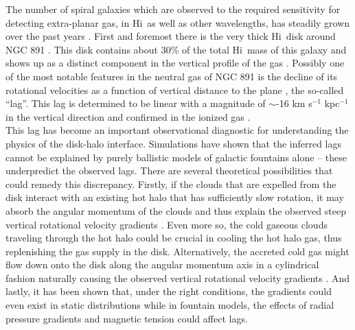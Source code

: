 \documentclass[useAMS,usenatbib]{mn2e}
\newcommand\HI{H{\sc i}}
\begin{document}
\indent The number of spiral galaxies which are observed to the required sensitivity for detecting extra-planar gas, in \HI\ as well as other wavelengths, has steadily grown over the past years  \citep{1997ApJ...491..140S, 2000A&A...356L..49S,2001A&A...377..759L,2002AJ....123.3124F,2005A&A...439..947B,2005A&A...436..101W,2008A&A...490..555B, Zschaechner2011}. First and foremost there is  the very thick \HI\ disk around NGC 891 \citep{1997ApJ...491..140S, Oosterloo2007}.  This disk contains about 30\% of the total \HI\ mass of this galaxy and shows up as a distinct component in the vertical profile of the gas \citep{Oosterloo2007}. Possibly  one of the most notable features in the neutral gas  of NGC 891 is the  decline of its rotational velocities as a function of vertical distance to the plane \citep{2005ASPC..331..239F}, the so-called ``lag''. This lag is determined to be linear with a magnitude of  $\sim$-16 km s$^{-1}$ kpc$^{-1}$ in the vertical direction and confirmed in the ionized gas \citep{2006ApJ...647.1018H,Kamphuis2007a}.\\
\indent This lag has become an important observational diagnostic for understanding the physics of the disk-halo interface. Simulations have shown that the inferred lags cannot be explained by purely ballistic models of galactic fountains alone \citep{2002ApJ...578...98C,2007ApJ...663..933H,2008MNRAS.386..935F} -- these underpredict the observed lags. There are several theoretical possibilities that could remedy this discrepancy. Firstly, if the clouds that are expelled from the disk interact with an existing hot halo that has sufficiently slow rotation, it may absorb the angular momentum of the clouds and thus explain the observed steep vertical rotational velocity gradients \citep{2011MNRAS.415.1534M}. Even more so, the cold gaseous clouds traveling through the hot halo could be crucial in cooling the hot halo gas, thus replenishing the gas supply in the disk. Alternatively, the accreted cold gas might flow down onto the disk along the angular momentum axis in a cylindrical fashion naturally causing the observed vertical rotational velocity gradients \citep{2006MNRAS.370.1612K}. And lastly, it has been shown that, under the right conditions, the gradients could even exist in static distributions  \citep{2002ASPC..276..201B, 2006A&A...446...61B} while in fountain models, the effects of radial pressure gradients and magnetic tension could affect lags.\\
\end{document}
